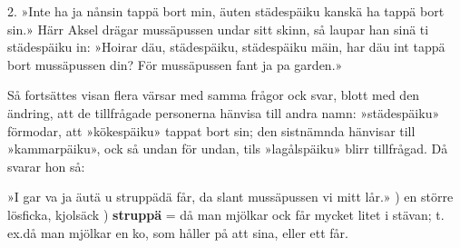 2.  »Inte ha ja nånsin tappä bort min,
    äuten städespäiku kanskä ha tappä bort sin.»
    Härr Aksel drägar mussäpussen undar sitt skinn,
    så laupar han sinä ti städespäiku in:
    »Hoirar däu, städespäiku, städespäiku mäin,
    har däu int tappä bort mussäpussen din?
    För mussäpussen fant ja pa garden.»
\vspace{8mm}
\tabto{0cm}
\parbox{12.5cm}{Så fortsättes visan flera värsar med samma frågor ock svar, blott med
den ändring, att de tillfrågade personerna hänvisa till andra namn:
»städespäiku» förmodar, att »kökespäiku» tappat bort sin; den sistnämnda hänvisar
till »kammarpäiku», ock så undan för undan, tils »lagålspäiku» blirr tillfrågad.
Då svarar hon så:}

\vspace{5mm}
    »I gar va ja äutä u struppädä får,
    da slant mussäpussen vi mitt lår.»
\vspace{12mm}
\tabto{0.2cm}) \tabto{0.7cm}en större lösficka, kjolsäck
\tabto{0.2cm}) \tabto{0.7cm}\textbf{struppä} = då man mjölkar ock får mycket litet i stävan; t.\,ex.\@ då
\tabto{0.7cm}man mjölkar en ko, som håller på att sina, eller ett får.
